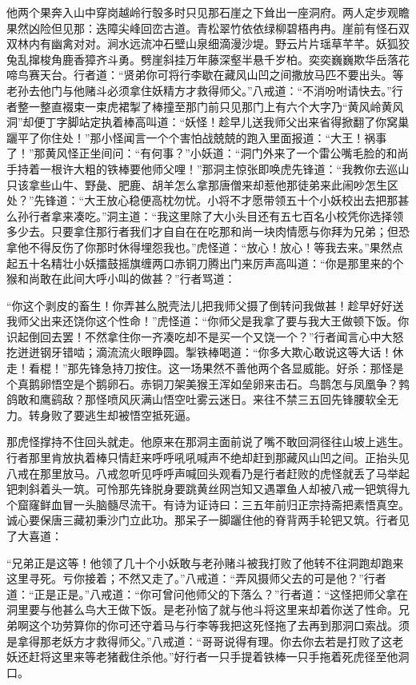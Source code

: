 \documentclass[12pt,UTF8]{ctexbook}
\begin{document}
他两个果奔入山中穿岗越岭行彀多时只见那石崖之下耸出一座洞府。两人定步观瞻果然凶险但见那：迭障尖峰回峦古道。青松翠竹依依绿柳碧梧冉冉。崖前有怪石双双林内有幽禽对对。涧水远流冲石壁山泉细滴漫沙堤。野云片片瑶草芊芊。妖狐狡兔乱撺梭角鹿香獐齐斗勇。劈崖斜挂万年藤深壑半悬千岁柏。奕奕巍巍欺华岳落花啼鸟赛天台。行者道：“贤弟你可将行李歇在藏风山凹之间撒放马匹不要出头。等老孙去他门与他赌斗必须拿住妖精方才救得师父。”八戒道：“不消吩咐请快去。”行者整一整直裰束一束虎裙掣了棒撞至那门前只见那门上有六个大字乃“黄风岭黄风洞”却便丁字脚站定执着棒高叫道：“妖怪！趁早儿送我师父出来省得掀翻了你窝巢躧平了你住处！”那小怪闻言一个个害怕战兢兢的跑入里面报道：“大王！祸事了！”那黄风怪正坐间问：“有何事？”小妖道：“洞门外来了一个雷公嘴毛脸的和尚手持着一根许大粗的铁棒要他师父哩！”那洞主惊张即唤虎先锋道：“我教你去巡山只该拿些山牛、野彘、肥鹿、胡羊怎么拿那唐僧来却惹他那徒弟来此闹吵怎生区处？”先锋道：“大王放心稳便高枕勿忧。小将不才愿带领五十个小妖校出去把那甚么孙行者拿来凑吃。”洞主道：“我这里除了大小头目还有五七百名小校凭你选择领多少去。只要拿住那行者我们才自自在在吃那和尚一块肉情愿与你拜为兄弟；但恐拿他不得反伤了你那时休得埋怨我也。”虎怪道：“放心！放心！等我去来。”果然点起五十名精壮小妖擂鼓摇旗缠两口赤铜刀腾出门来厉声高叫道：“你是那里来的个猴和尚敢在此间大呼小叫的做甚？”行者骂道：

“你这个剥皮的畜生！你弄甚么脱壳法儿把我师父摄了倒转问我做甚！趁早好好送我师父出来还饶你这个性命！”虎怪道：“你师父是我拿了要与我大王做顿下饭。你识起倒回去罢！不然拿住你一齐凑吃却不是买一个又饶一个？”行者闻言心中大怒扢迸迸钢牙错啮；滴流流火眼睁圆。掣铁棒喝道：“你多大欺心敢说这等大话！休走！看棍！”那先锋急持刀按住。这一场果然不善他两个各显威能。好杀：那怪是个真鹅卵悟空是个鹅卵石。赤铜刀架美猴王浑如垒卵来击石。鸟鹊怎与凤凰争？鹁鸽敢和鹰鹞敌？那怪喷风灰满山悟空吐雾云迷日。来往不禁三五回先锋腰软全无力。转身败了要逃生却被悟空抵死逼。

那虎怪撑持不住回头就走。他原来在那洞主面前说了嘴不敢回洞径往山坡上逃生。行者那里肯放执着棒只情赶来呼呼吼吼喊声不绝却赶到那藏风山凹之间。正抬头见八戒在那里放马。八戒忽听见呼呼声喊回头观看乃是行者赶败的虎怪就丢了马举起钯刺斜着头一筑。可怜那先锋脱身要跳黄丝网岂知又遇罩鱼人却被八戒一钯筑得九个窟窿鲜血冒一头脑髓尽流干。有诗为证诗曰：三五年前归正宗持斋把素悟真空。诚心要保唐三藏初秉沙门立此功。那呆子一脚躧住他的脊背两手轮钯又筑。行者见了大喜道：

“兄弟正是这等！他领了几十个小妖敢与老孙赌斗被我打败了他转不往洞跑却跑来这里寻死。亏你接着；不然又走了。”八戒道：“弄风摄师父去的可是他？”行者道：“正是正是。”八戒道：“你可曾问他师父的下落么？”行者道：“这怪把师父拿在洞里要与他甚么鸟大王做下饭。是老孙恼了就与他斗将这里来却着你送了性命。兄弟啊这个功劳算你的你可还守着马与行李等我把这死怪拖了去再到那洞口索战。须是拿得那老妖方才救得师父。”八戒道：“哥哥说得有理。你去你去若是打败了这老妖还赶将这里来等老猪截住杀他。”好行者一只手提着铁棒一只手拖着死虎径至他洞口。
\end{document}
